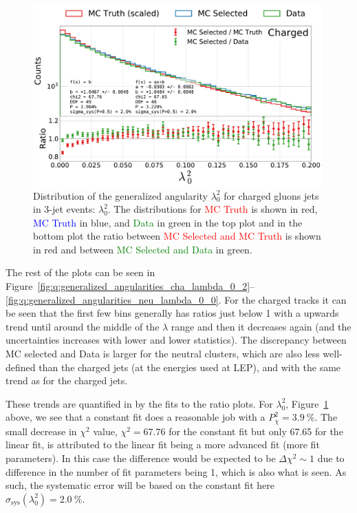 \begin{figure}[h!]
  \centerfloat
  \includegraphics[width=0.99\textwidth, trim=0 0 0 0, clip, page=1]{figures/quarks/generalized_angularities_cha-down_sample=1.00-ML_vars=vertex-selection=b-ejet_min=4-n_iter_RS_lgb=99-n_iter_RS_xgb=9-cdot_cut=0.90-version=19.pdf}
  \caption[Generalized Angularities for Charged Gluons Jets in 3-Jet Events: $\lambda_0^2$]
          {Distribution of the generalized angularity $\lambda_0^2$ for charged gluons jets in 3-jet events: $\lambda_0^2$. The distributions for \textcolor{red}{MC Truth} is shown in red, \textcolor{blue}{MC Truth} in blue, and \textcolor{green}{Data} in green in the top plot and in the bottom plot the ratio between \textcolor{red}{MC Selected and MC Truth} is shown in red and between \textcolor{green}{MC Selected and Data} in green. }
  \label{fig:q:generalized_angularities_cha_lambda_0_2_nonappendix}
\end{figure}
\vspace{-3mm} 

The rest of the plots can be seen in Figure~\ref{fig:q:generalized_angularities_cha_lambda_0_2}--\ref{fig:q:generalized_angularities_neu_lambda_0_0}. For the charged tracks it can be seen that the first few bins generally has ratios just below \num{1} with a upwards trend until around the middle of the $\lambda$ range and then it decreases again (and the uncertainties increases with lower and lower statistics). The discrepancy between MC selected and Data is larger for the neutral clusters, which are also less well-defined than the charged jets (at the energies used at LEP), and with the same trend as for the charged jets. 

These trends are quantified in by the fits to the ratio plots. For $\lambda_0^2$, Figure~\ref{fig:q:generalized_angularities_cha_lambda_0_2_nonappendix} above, we see that a constant fit does a reasonable job with a $P_\chi^2=\SI{3.9}{\percent}$. The small decrease in $\chi^2$ value, $\chi^2 = 67.76$ for the constant fit but only \num{67.65} for the linear fit, is attributed to the linear fit being a more advanced fit (more fit parameters). In this case the difference would be expected to be $\Delta \chi^2 \sim 1$ due to difference in the number of fit parameters being \num{1}, which is also what is seen. As such, the systematic error will be based on the constant fit here $\sigma_\mathrm{sys}(\lambda_0^2)=\SI{2.0}{\percent}$. 


